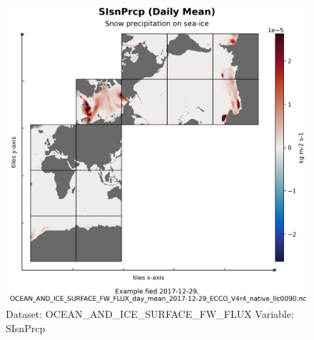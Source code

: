\begin{figure}[H]
\centering
\includegraphics[width=\textwidth]{../images/plots/native_plots/Ocean_and_Sea-Ice_Surface_Freshwater_Fluxes/SIsnPrcp.png}
\caption{Dataset: OCEAN\_AND\_ICE\_SURFACE\_FW\_FLUX Variable: SIsnPrcp}
\label{tab:table-OCEAN_AND_ICE_SURFACE_FW_FLUX_SIsnPrcp-Plot}
\end{figure}
\pagebreak
